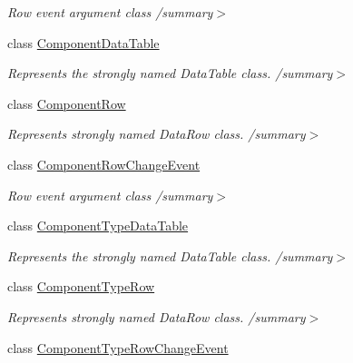 \begin{DoxyCompactItemize}
\begin{DoxyCompactList}\small\item\em Row event argument class /summary$>$ \end{DoxyCompactList}\item 
class \hyperlink{class_env_int_1_1_win32_1_1_field_tech_1_1_manager_1_1_data_sets_1_1_guide_ware_mobile_data_set_1_1_component_data_table}{Component\+Data\+Table}
\begin{DoxyCompactList}\small\item\em Represents the strongly named Data\+Table class. /summary$>$ \end{DoxyCompactList}\item 
class \hyperlink{class_env_int_1_1_win32_1_1_field_tech_1_1_manager_1_1_data_sets_1_1_guide_ware_mobile_data_set_1_1_component_row}{Component\+Row}
\begin{DoxyCompactList}\small\item\em Represents strongly named Data\+Row class. /summary$>$ \end{DoxyCompactList}\item 
class \hyperlink{class_env_int_1_1_win32_1_1_field_tech_1_1_manager_1_1_data_sets_1_1_guide_ware_mobile_data_set_1_1_component_row_change_event}{Component\+Row\+Change\+Event}
\begin{DoxyCompactList}\small\item\em Row event argument class /summary$>$ \end{DoxyCompactList}\item 
class \hyperlink{class_env_int_1_1_win32_1_1_field_tech_1_1_manager_1_1_data_sets_1_1_guide_ware_mobile_data_set_1_1_component_type_data_table}{Component\+Type\+Data\+Table}
\begin{DoxyCompactList}\small\item\em Represents the strongly named Data\+Table class. /summary$>$ \end{DoxyCompactList}\item 
class \hyperlink{class_env_int_1_1_win32_1_1_field_tech_1_1_manager_1_1_data_sets_1_1_guide_ware_mobile_data_set_1_1_component_type_row}{Component\+Type\+Row}
\begin{DoxyCompactList}\small\item\em Represents strongly named Data\+Row class. /summary$>$ \end{DoxyCompactList}\item 
class \hyperlink{class_env_int_1_1_win32_1_1_field_tech_1_1_manager_1_1_data_sets_1_1_guide_ware_mobile_data_set_6cb4a1a3a59d09909759d45113e3e872}{Component\+Type\+Row\+Change\+Event}

\end{DoxyCompactItemize}
